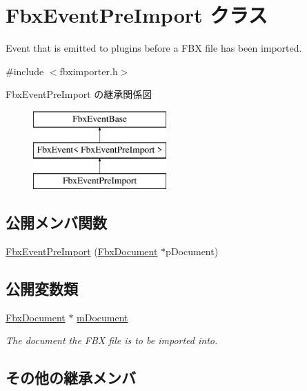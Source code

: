 \hypertarget{class_fbx_event_pre_import}{}\section{Fbx\+Event\+Pre\+Import クラス}
\label{class_fbx_event_pre_import}


Event that is emitted to plugins before a F\+BX file has been imported.  




{\ttfamily \#include $<$fbximporter.\+h$>$}

Fbx\+Event\+Pre\+Import の継承関係図\begin{figure}[H]
\begin{center}
\leavevmode
\includegraphics[height=3.000000cm]{class_fbx_event_pre_import}
\end{center}
\end{figure}
\subsection*{公開メンバ関数}
\begin{DoxyCompactItemize}
\item 
\hyperlink{class_fbx_event_pre_import_a67755900fb239a5c7d67b8e22d92eb60}{Fbx\+Event\+Pre\+Import} (\hyperlink{class_fbx_document}{Fbx\+Document} $\ast$p\+Document)
\end{DoxyCompactItemize}
\subsection*{公開変数類}
\begin{DoxyCompactItemize}
\item 
\hyperlink{class_fbx_document}{Fbx\+Document} $\ast$ \hyperlink{class_fbx_event_pre_import_a89b454dc61f00b64cc8a8f951e5e1003}{m\+Document}
\begin{DoxyCompactList}\small\item\em The document the F\+BX file is to be imported into. \end{DoxyCompactList}\end{DoxyCompactItemize}
\subsection*{その他の継承メンバ}


